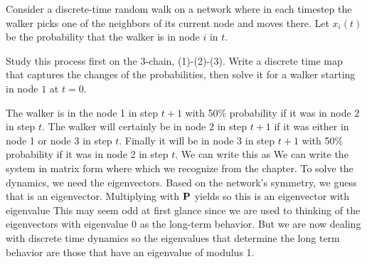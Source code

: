 Consider a discrete-time random walk on a network where in each timestep 
the walker picks one of the neighbors of its current node and moves there. 
Let $x_i(t)$ be the probability that the walker is in node $i$ in $t$. 

\subquestion 
Study this process first on the 3-chain, (1)-(2)-(3). Write a discrete time map that captures the changes of the probabilities, then solve it for a walker starting in node $1$ at $t=0$. 

\solution 
The walker is in the node 1 in step $t+1$ with 50\% probability if it was in node $2$ in step $t$. The walker will certainly be in node 2 in step $t+1$ if it was either in node 1 or node 3 in step $t$. Finally it will be in node 3 in step $t+1$ with 50\% probability if it was in node 2 in step $t$. We can write this as
We can write the system in matrix form 
where
which we recognize from the chapter. To solve the dynamics, we need the eigenvectors. Based on the network's symmetry, we guess that 
is an eigenvector. Multiplying with $\bf P$ yields 
so this is an eigenvector with eigenvalue 
This may seem odd at first glance since we are used to thinking of the eigenvectors with eigenvalue 0 as the long-term behavior. But we are now dealing with discrete time dynamics so the eigenvalues that determine the long term behavior are those that have an eigenvalue of modulus 1. 

